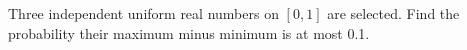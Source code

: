 Three independent uniform real numbers on $[0,1]$ are selected. Find the probability their maximum minus minimum is at most 0.1.
